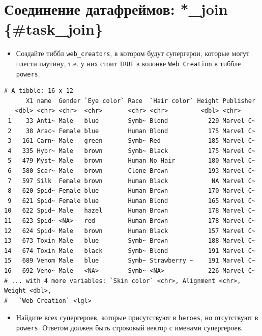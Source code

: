 \documentclass[
]{book}
\providecommand{\tightlist}{%
  \setlength{\itemsep}{0pt}\setlength{\parskip}{0pt}}
\begin{document}
\hypertarget{ux441ux43eux435ux434ux438ux43dux435ux43dux438ux435-ux434ux430ux442ux430ux444ux440ux435ux439ux43cux43eux432-_join-task_join}{%
\section{Соединение датафреймов: *\_join \{\#task\_join\}}\label{ux441ux43eux435ux434ux438ux43dux435ux43dux438ux435-ux434ux430ux442ux430ux444ux440ux435ux439ux43cux43eux432-_join-task_join}}

\begin{itemize}
\tightlist
\item
  Создайте тиббл \texttt{web\_creators}, в котором будут супергерои, которые могут плести паутину, т.е. у них стоит \texttt{TRUE} в колонке \texttt{Web\ Creation} в тиббле \texttt{powers}.
\end{itemize}

\begin{verbatim}
# A tibble: 16 x 12
      X1 name  Gender `Eye color` Race  `Hair color` Height Publisher
   <dbl> <chr> <chr>  <chr>       <chr> <chr>         <dbl> <chr>    
 1    33 Anti~ Male   blue        Symb~ Blond           229 Marvel C~
 2    38 Arac~ Female blue        Human Blond           175 Marvel C~
 3   161 Carn~ Male   green       Symb~ Red             185 Marvel C~
 4   335 Hybr~ Male   brown       Symb~ Black           175 Marvel C~
 5   479 Myst~ Male   brown       Human No Hair         180 Marvel C~
 6   580 Scar~ Male   brown       Clone Brown           193 Marvel C~
 7   597 Silk  Female brown       Human Black            NA Marvel C~
 8   620 Spid~ Female blue        Human Brown           170 Marvel C~
 9   621 Spid~ Female blue        Human Blond           165 Marvel C~
10   622 Spid~ Male   hazel       Human Brown           178 Marvel C~
11   623 Spid~ <NA>   red         Human Brown           178 Marvel C~
12   624 Spid~ Male   brown       Human Black           157 Marvel C~
13   673 Toxin Male   blue        Symb~ Brown           188 Marvel C~
14   674 Toxin Male   black       Symb~ Blond           191 Marvel C~
15   689 Venom Male   blue        Symb~ Strawberry ~    191 Marvel C~
16   692 Veno~ Male   <NA>        Symb~ <NA>            226 Marvel C~
# ... with 4 more variables: `Skin color` <chr>, Alignment <chr>, Weight <dbl>,
#   `Web Creation` <lgl>
\end{verbatim}

\begin{itemize}
\tightlist
\item
  Найдите всех супергероев, которые присутствуют в \texttt{heroes}, но отсутствуют в \texttt{powers}. Ответом должен быть строковый вектор с именами супергероев.
\end{itemize}
\end{document}

